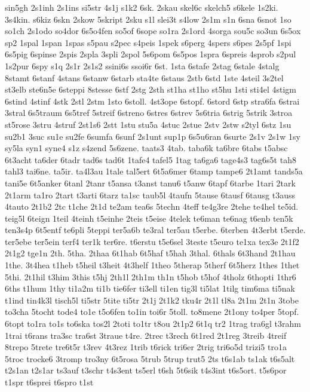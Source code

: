 {sin5gh
2s1inh
2s1ins
si5str
4s1j
s1k2
6sk.
2skau
skel6c
skelch5
s6kele
1s2ki.
3s4kin.
s6kiz
6skn
2skow
5skript
2sku
s1l
slei3t
s4low
2s1m
s1n
6sna
6snot
1so
so1ch
2s1odo
so4dor
6s5o4fen
so5of
6sope
so1ra
2s1ord
4sorga
sou5c
so3un
6s5ox
sp2
1spal
1span
1spas
s5pau
s2pec
s4peis
1spek
s6perg
4spers
s6pes
2s5pf
1spi
6s5pig
6spinse
2spis
2spla
3spli
2spol
5s6pom
6s5pos
1spra
6spreis
4sprob
s2pul
1s2pur
6spy
s1q
2s1r
2s1s2
ssini6s
ssoi6r
6st.
1sta
6stafe
2stag
6stale
4stalg
8stamt
6stanf
4stans
6stanw
6starb
sta4te
6staus
2stb
6std
1ste
4steil
3s2tel
st3elb
ste6n5e
6steppi
8stesse
6stf
2stg
2sth
st1ha
st1ho
st5hu
1sti
sti4el
4stigm
6stind
4stinf
4stk
2stl
2stm
1sto
6stoll.
4st3ope
6stopf.
6stord
6stp
stra6fa
6strai
3stral
6s5traum
6s5tref
5streif
6streno
6stres
6strev
5s6tria
6strig
5strik
3stroa
st5rose
3stru
4struf
2st1s6
2stt
1stu
stu5a
4stuc
2stue
2stv
2stw
s2tyl
6stz
1su
su2b1
3suc
su1e
su2fe
6sumfa
6sunf
2s1unt
sup1p
6s5u6ran
6surte
2s1v
2s1w
1sy
sy5la
syn1
syne4
s1z
s4zend
5s6zene.
taats3
4tab.
taba6k
ta6bre
6tabs
t5absc
6t3acht
ta6der
6tadr
tad6s
tad6t
1tafe4
tafel5
1tag
ta6ga6
tage4s3
tag6s5t
tah8
tahl3
tai6ne.
ta5ir.
ta4l3au
1tale
tal5ert
6t5a6mer
6tamp
tampe6
2t1amt
tands5a
tani5e
6t5anker
6tanl
2tanr
t5ansa
t3anst
tanu6
t5anw
6tapf
6tarbe
1tari
2tark
2t1arm
ta1ro
2tart
t3arti
6tarz
ta1sc
taub5l
4taufn
5tause
6tausf
6tausg
t3auss
4tauto
2t1b2
2tc
t1che
2t1d
te2am
tea6s
5techn
4teff
te4g3re
2tehe
te4hel
te5id.
teig5l
6teign
1teil
4teinh
t5einhe
2teis
t5eise
4telek
te6man
te6nag
t6enb
ten5k
ten3s4p
6t5entf
te6pli
5teppi
ter5a6b
te3ral
ter5au
t5erbe.
6terben
4t3erbt
t5erde.
ter5ebe
ter5ein
terf4
ter1k
ter6re.
t6erstu
t5e6sel
3teste
t5euro
te1xa
tex3e
2t1f2
2t1g2
tge1n
2th.
5tha.
2thaa
6t1hab
6t5haf
t5hah
3thal.
6thals
6t3hand
2t1hau
1the.
3t4hea
t1heb
t5heil
t3heit
4t3helf
1theo
5therap
5therf
6t5herz
1thes
1thet
5thi.
2t1hil
t3him
3this
t5hj
2th1l
2th1m
th1n
t5hob
t5hof
4tholz
6thopti
1thr6
6ths
t1hum
1thy
ti1a2m
ti1b
tie6fer
ti3ell
ti1en
tig3l
ti5lat
1tilg
tim6ma
ti5nak
t1ind
tin4k3l
tisch5l
ti5str
5tite
ti5tr
2t1j
2t1k2
tku4r
2t1l
tl8a
2t1m
2t1n
3tobe
to3cha
5tocht
tode4
to1e
t5o6fen
to1in
toi6r
5toll.
to8mene
2t1ony
to4per
5topf.
6topt
to1ra
to1s
to6ska
tos2l
2toti
to1tr
t8ou
2t1p2
6t1q
tr2
1trag
tra6gl
t3rahm
1trai
t6rans
tra3sc
tra6st
3traue
t4re.
2trec
t3rech
6t1red
2t1reg
3treib
4treif
8trepo
5trete
tre6t5r
t3rev
4t3rez
1trib
t6rick
tri6er
2trig
tri6o5d
trizi5
tro1a
5troc
trocke6
3tromp
tro3ny
6t5rosa
5trub
5trup
trut5
2ts
t6s1ab
ts1ak
t6s5alt
t2s1an
t2s1ar
ts3auf
t3schr
t4s3ent
ts5erl
t6sh
5t6sik
t4s3int
t6s5ort.
t5s6por
t1spr
t6sprei
t6spro
t1st
}
